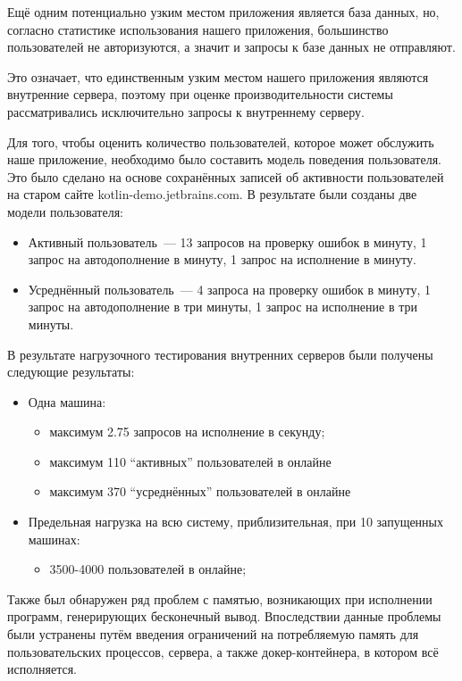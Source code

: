 	Ещё одним потенциально узким местом приложения является база данных, но, согласно статистике использования нашего приложения, большинство пользователей не авторизуются, а значит и запросы к базе данных не отправляют.
	
	Это означает, что единственным узким местом нашего приложения являются внутренние сервера, поэтому при оценке производительности системы рассматривались исключительно запросы к внутреннему серверу.

	Для того, чтобы оценить количество пользователей, которое может обслужить наше приложение, необходимо было составить модель поведения пользователя. Это было сделано на основе сохранённых записей об активности пользователей на старом сайте kotlin-demo.jetbrains.com. В результате были созданы две модели пользователя:
\begin{itemize}
	\item Активный пользователь~--- 13 запросов на проверку ошибок в минуту, 1 запрос на автодополнение в минуту, 1 запрос на исполнение в минуту.
	\item Усреднённый пользователь~--- 4 запроса на проверку ошибок в минуту, 1 запрос на автодополнение в три минуты, 1 запрос на исполнение в три минуты.
\end{itemize}
	
	В результате нагрузочного тестирования внутренних серверов были получены следующие результаты:
	\begin{itemize}
		\item Одна машина:
		\begin{itemize}
			\item максимум 2.75 запросов на исполнение в секунду;
			\item максимум 110 ``активных'' пользователей в онлайне
			\item максимум 370 ``усреднённых'' пользователей в онлайне 
		\end{itemize}
		
		\item Предельная нагрузка на всю систему, приблизительная, при 10 запущенных машинах:
		\begin{itemize}
			\item 3500-4000 пользователей в онлайне;
		\end{itemize} 
	\end{itemize}
	Также был обнаружен ряд проблем с памятью, возникающих при исполнении программ, генерирующих бесконечный вывод. Впоследствии данные проблемы были устранены путём введения ограничений на потребляемую память для пользовательских процессов, сервера, а также докер-контейнера, в котором всё исполняется.
	
